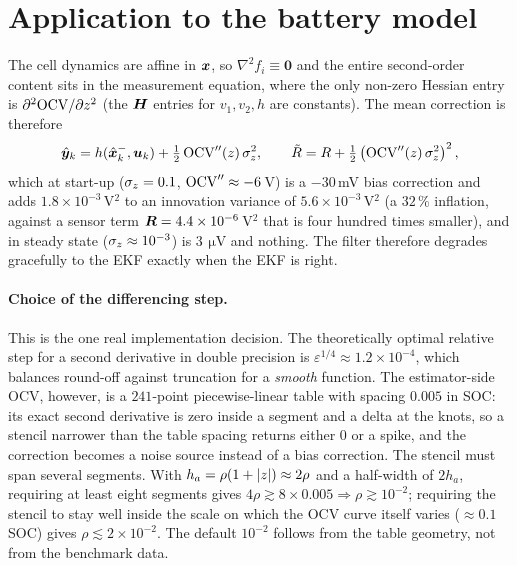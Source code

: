 \section{Application to the battery model}
The cell dynamics are affine in $\bm{x}$, so $\nabla^2 f_i \equiv \bm0$ and the entire
second-order content sits in the measurement equation, where the only non-zero Hessian entry
is $\partial^2\mathrm{OCV}/\partial z^2$ (the $\bm{H}$ entries for $v_1,v_2,h$ are constants). The
mean correction is therefore
\begin{equation}
\hat{\bm{y}}_k = h(\hat{\bm{x}}^{-}_k,\bm{u}_k) + \tfrac12\,\mathrm{OCV}''(z)\,\sigma_z^2,
\qquad
\tilde{R} = R + \tfrac12\left(\mathrm{OCV}''(z)\,\sigma_z^2\right)^2 ,
\label{eq:soekf-battery}
\end{equation}
which at start-up ($\sigma_z = 0.1$, $\mathrm{OCV}''\approx -6$\,V) is a $-30$\,mV bias correction
and adds $1.8\times10^{-3}$\,V$^2$ to an innovation variance of $5.6\times10^{-3}$\,V$^2$
(a $32\,\%$ inflation, against a sensor term $\bm{R} = 4.4\times10^{-6}$\,V$^2$ that is four
hundred times smaller), and in steady state
($\sigma_z\approx10^{-3}$) is $3\,\SI{}{\micro\volt}$ and nothing. The filter therefore
degrades gracefully to the EKF exactly when the EKF is right.

\paragraph{Choice of the differencing step.} This is the one real implementation decision.
The theoretically optimal relative step for a second derivative in double precision is
$\varepsilon^{1/4}\approx 1.2\times10^{-4}$, which balances round-off against truncation for a
\emph{smooth} function. The estimator-side OCV, however, is a $241$-point piecewise-linear
table with spacing $0.005$ in SOC: its exact second derivative is zero inside a segment and a
delta at the knots, so a stencil narrower than the table spacing returns either $0$ or a
spike, and the correction becomes a noise source instead of a bias correction. The stencil
must span several segments. With $h_a = \rho(1+\left\lvert z \right\rvert)\approx 2\rho$ and a half-width of
$2h_a$, requiring at least eight segments gives
$4\rho \gtrsim 8\times0.005 \Rightarrow \rho\gtrsim 10^{-2}$; requiring the stencil to stay
well inside the scale on which the OCV curve itself varies ($\approx 0.1$ SOC) gives
$\rho\lesssim 2\times10^{-2}$. The default $10^{-2}$ follows from the
table geometry, not from the benchmark data.

